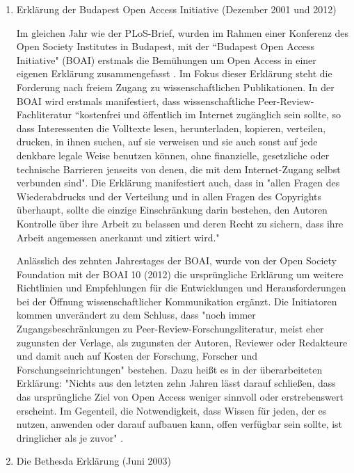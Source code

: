 \begin{enumerate}

\item Erklärung der Budapest Open Access Initiative (Dezember 2001 und 2012)

Im gleichen Jahr wie der PLoS-Brief, wurden im Rahmen einer Konferenz des Open Society Institutes in Budapest, mit der “Budapest Open Access Initiative" (BOAI)\cite{boai_2012} erstmals die Bemühungen um Open Access in einer eigenen Erklärung zusammengefasst \cite{cite:21a}. Im Fokus dieser Erklärung steht die Forderung nach freiem Zugang zu wissenschaftlichen Publikationen. In der BOAI wird erstmals manifestiert, dass wissenschaftliche Peer-Review-Fachliteratur “kostenfrei und öffentlich im Internet zugänglich sein sollte, so dass Interessenten die Volltexte lesen, herunterladen, kopieren, verteilen, drucken, in ihnen suchen, auf sie verweisen und sie auch sonst auf jede denkbare legale Weise benutzen können, ohne finanzielle, gesetzliche oder technische Barrieren jenseits von denen, die mit dem Internet-Zugang selbst verbunden sind". \cite{boai_2012} Die Erklärung manifestiert auch, dass in "allen Fragen des Wiederabdrucks und der Verteilung und in allen Fragen des Copyrights überhaupt, sollte die einzige Einschränkung darin bestehen, den Autoren Kontrolle über ihre Arbeit zu belassen und deren Recht zu sichern, dass ihre Arbeit angemessen anerkannt und zitiert wird." \cite{boai_2012}

Anlässlich des zehnten Jahrestages der BOAI, wurde von der Open Society Foundation mit der BOAI 10 (2012) die ursprüngliche Erklärung um weitere Richtlinien und Empfehlungen für die Entwicklungen und Herausforderungen bei der Öffnung wissenschaftlicher Kommunikation ergänzt. Die Initiatoren kommen unverändert zu dem Schluss, dass "noch immer Zugangsbeschränkungen zu Peer-Review-Forschungsliteratur, meist eher zugunsten der Verlage, als zugunsten der Autoren, Reviewer oder Redakteure und damit auch auf Kosten der Forschung, Forscher und Forschungseinrichtungen" \cite{boai_2012} bestehen. Dazu heißt es in der überarbeiteten Erklärung: "Nichts aus den letzten zehn Jahren lässt darauf schließen, dass das ursprüngliche Ziel von Open Access weniger sinnvoll oder erstrebenswert erscheint. Im Gegenteil, die Notwendigkeit, dass Wissen für jeden, der es nutzen, anwenden oder darauf aufbauen kann, offen verfügbar sein sollte, ist dringlicher als je zuvor" \cite{boai_2012}.

\item Die Bethesda Erklärung (Juni 2003)


\end{enumerate}

